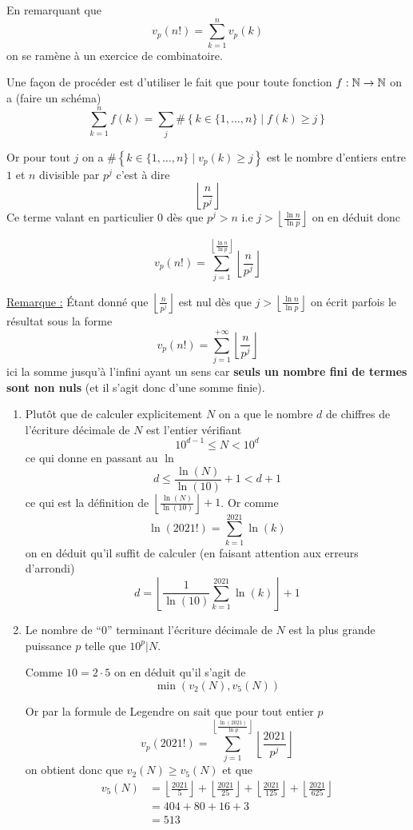 \begin{sol}
En remarquant que
$$v_p(n!) = \sum_{k = 1}^n v_p(k)$$
on se ramène à un exercice de combinatoire.

Une façon de procéder est d'utiliser le fait que pour toute fonction $f : \mathbb N \to \mathbb N$ on a (faire un schéma)
$$\sum_{k = 1}^n f(k) = \sum_j \# \left\lbrace k \in \{1,\ldots,n\} \mid f(k) \ge j\right\rbrace$$

Or pour tout $j$  on a $\# \left\lbrace k \in \{1,\ldots,n\} \mid v_p(k) \ge j\right\rbrace$ est le nombre d'entiers entre $1$ et $n$ divisible par $p^j$ c'est à dire
$$\left\lfloor \frac n{p^j} \right\rfloor$$
Ce terme valant en particulier  $0$ dès que $p^j > n$ i.e $j > \left\lfloor \frac{\ln n}{\ln p} \right\rfloor$ on en déduit donc

$$\boxed{v_p(n!) = \sum_{j = 1}^{\left\lfloor \frac{\ln n}{\ln p} \right\rfloor} \left\lfloor \frac n{p^j} \right\rfloor}$$

\underline{Remarque :} Étant donné que $\left\lfloor \frac n{p^j} \right\rfloor$ est nul dès que $j > \left\lfloor \frac{\ln n}{\ln p} \right\rfloor$ on écrit parfois le résultat sous la forme
$${v_p(n!) = \sum_{j = 1}^{ + \infty}  \left\lfloor \frac n{p^j} \right\rfloor}$$
ici la somme jusqu'à l'infini ayant un sens car \textbf{seuls un nombre fini de termes sont non nuls} (et il s'agit donc d'une somme finie).
\end{sol}


\begin{sol}
\begin{enumerate}
\item Plutôt que de calculer explicitement $N$ on a que le nombre $d$ de chiffres de l'écriture décimale de $N$ est l'entier vérifiant
$$10^{d-1} \le N < 10^{d}$$
ce qui donne en passant au $\ln$
$$d \le \frac{\ln(N)}{\ln(10)} + 1 < d + 1$$
ce qui est la définition de $\left\lfloor \frac{\ln(N)}{\ln(10)} \right\rfloor + 1$. Or comme
$$\ln(2021!) = \sum_{k = 1}^{2021} \ln(k)$$
on en déduit qu'il suffit de calculer (en faisant attention aux erreurs d'arrondi)
$$ \boxed{d = \left\lfloor \frac{1}{\ln(10)} \sum_{k = 1}^{2021} \ln(k) \right\rfloor + 1}$$
\item Le nombre de ``$0$'' terminant l'écriture décimale de $N$ est la plus grande puissance $p$ telle que $10^p | N$.

Comme $10  = 2 \cdot 5$ on en déduit qu'il s'agit de
$$\min(v_2(N),v_5(N))$$

Or par la formule de Legendre on sait que pour tout entier $p$
$$v_p(2021!) = \sum_{j = 1}^{\left\lfloor \frac{\ln(2021)}{\ln p} \right\rfloor} \left\lfloor \frac{2021}{p^j} \right\rfloor$$
on obtient donc que $v_2(N) \ge v_5(N)$ et que
$$\begin{aligned}
v_5(N)
& = \left\lfloor \frac{2021}{5} \right\rfloor + \left\lfloor \frac{2021}{25} \right\rfloor + \left\lfloor \frac{2021}{125} \right\rfloor + \left\lfloor \frac{2021}{625} \right\rfloor \\
& = 404 + 80 + 16 + 3 \\
& = \boxed{513}
\end{aligned}$$
\end{enumerate}
\end{sol}


